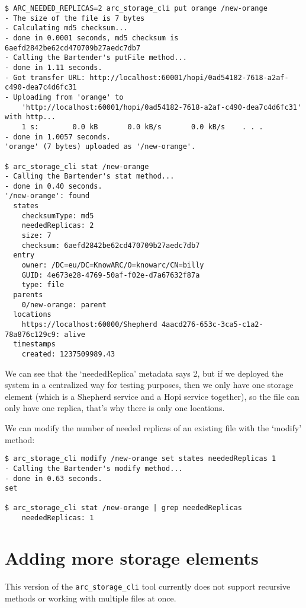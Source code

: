 \documentclass{book}
\begin{document}
\begin{verbatim}
$ ARC_NEEDED_REPLICAS=2 arc_storage_cli put orange /new-orange
- The size of the file is 7 bytes
- Calculating md5 checksum...
- done in 0.0001 seconds, md5 checksum is 6aefd2842be62cd470709b27aedc7db7
- Calling the Bartender's putFile method...
- done in 1.11 seconds.
- Got transfer URL: http://localhost:60001/hopi/0ad54182-7618-a2af-c490-dea7c4d6fc31
- Uploading from 'orange' to
    'http://localhost:60001/hopi/0ad54182-7618-a2af-c490-dea7c4d6fc31' with http...
    1 s:        0.0 kB       0.0 kB/s       0.0 kB/s    . . .       
- done in 1.0057 seconds.
'orange' (7 bytes) uploaded as '/new-orange'.

$ arc_storage_cli stat /new-orange
- Calling the Bartender's stat method...
- done in 0.40 seconds.
'/new-orange': found
  states
    checksumType: md5
    neededReplicas: 2
    size: 7
    checksum: 6aefd2842be62cd470709b27aedc7db7
  entry
    owner: /DC=eu/DC=KnowARC/O=knowarc/CN=billy
    GUID: 4e673e28-4769-50af-f02e-d7a67632f87a
    type: file
  parents
    0/new-orange: parent
  locations
    https://localhost:60000/Shepherd 4aacd276-653c-3ca5-c1a2-78a876c129c9: alive
  timestamps
    created: 1237509989.43

\end{verbatim}

We can see that the `neededReplica' metadata says 2, but if we deployed the system in a centralized way for testing purposes, then we only have one storage element (which is a Shepherd service and a Hopi service together), so the file can only have one replica, that's why there is only one locations.

We can modify the number of needed replicas of an existing file with the `modify' method:

\begin{verbatim}
$ arc_storage_cli modify /new-orange set states neededReplicas 1
- Calling the Bartender's modify method...
- done in 0.63 seconds.
set

$ arc_storage_cli stat /new-orange | grep neededReplicas
    neededReplicas: 1
\end{verbatim}

\section{Adding more storage elements}

This version of the \verb!arc_storage_cli! tool currently does not support recursive methods or working with multiple files at once.
\end{document}

